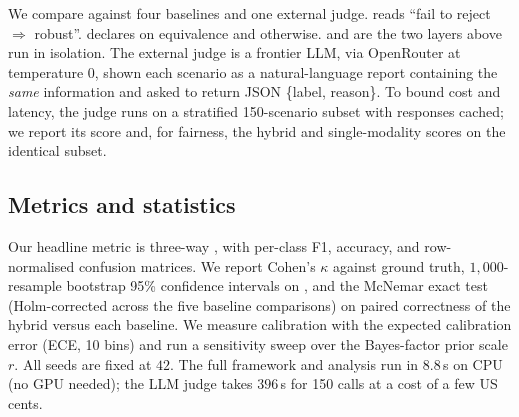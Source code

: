 We compare against four baselines and one external judge.
\nhst{} reads ``fail to reject $\Rightarrow$ robust''.
\tostonly{} declares \GR on equivalence and \WI otherwise.
\bayonly{} and \symonly{} are the two layers above run in isolation.
The external judge is a frontier LLM, \llmjudge{} via OpenRouter at temperature
$0$, shown each scenario as a natural-language report containing the \emph{same}
information and asked to return JSON \{label, reason\}. To bound cost and latency,
the judge runs on a stratified 150-scenario subset with responses cached; we
report its score and, for fairness, the hybrid and single-modality scores on the
identical subset.

\subsection{Metrics and statistics}

Our headline metric is three-way \macrofone, with per-class F1, accuracy, and
row-normalised confusion matrices. We report Cohen's $\kappa$ against ground
truth, $1{,}000$-resample bootstrap 95\% confidence intervals on \macrofone, and
the McNemar exact test (Holm-corrected across the five baseline comparisons) on
paired correctness of the hybrid versus each baseline. We measure calibration with
the expected calibration error (ECE, 10 bins) and run a sensitivity sweep over the
Bayes-factor prior scale $r$. All seeds are fixed at $42$. The full framework and
analysis run in $8.8$\,s on CPU (no GPU needed); the LLM judge takes $396$\,s for
150 calls at a cost of a few US cents.
